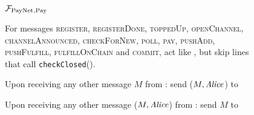 \begin{figure}[H]
  \begin{systembox}{$\mathcal{F}_{\mathrm{PayNet}}{}_{\mathrm{, Pay}}$}
    \begin{algorithmic}[1]
      \State For messages \textsc{register}, \textsc{registerDone},
      \textsc{toppedUp}, \textsc{openChannel}, \textsc{channelAnnounced},
      \textsc{checkForNew}, \textsc{poll}, \textsc{pay}, \textsc{pushAdd},
      \textsc{pushFulfill}, \textsc{fulfillOnChain} and \textsc{commit}, act
      like \fpaynet{}, but skip lines that call \texttt{checkClosed}().
      \Statex

      \State Upon receiving any other message $M$ from \alice:
      \Indent
          \State send ($M, \mathit{Alice}$) to \simulator
        \EndIf
      \EndIndent
      \Statex

      \State Upon receiving any other message ($M, \mathit{Alice}$) from \simulator:
      \Indent
          \State send $M$ to \alice
        \EndIf
      \EndIndent
    \end{algorithmic}
  \end{systembox}
  \caption{}
  \label{alg:proof:fpaynet:pay}
\end{figure}

